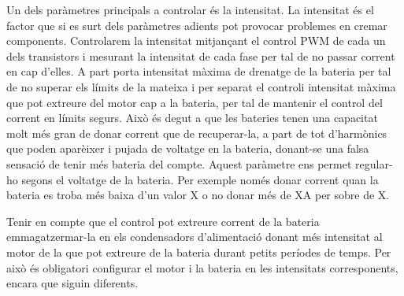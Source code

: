 Un dels paràmetres principals a controlar és la intensitat. La intensitat és el factor que si es surt dels paràmetres adients pot provocar problemes en cremar components. Controlarem la intensitat mitjançant el control PWM de cada un dels transistors i mesurant la intensitat de cada fase per tal de no passar corrent en cap d'elles. A part porta intensitat màxima de drenatge de la bateria per tal de no superar els límits de la mateixa i per separat el controli intensitat màxima que pot extreure del motor cap a la bateria, per tal de mantenir el control del corrent en límits segurs. Això és degut a que les bateries tenen una capacitat molt més gran de donar corrent que de recuperar-la, a part de tot d'harmònics que poden aparèixer i pujada de voltatge en la bateria, donant-se una falsa sensació de tenir més bateria del compte. Aquest paràmetre ens permet regular-ho segons el voltatge de la bateria. Per exemple només donar corrent quan la bateria es troba més baixa d'un valor X o no donar més de XA per sobre de X.
 
Tenir en compte que el control pot extreure corrent de la bateria emmagatzermar-la en els condensadors d'alimentació donant més intensitat al motor de la que pot extreure de la bateria durant petits períodes de temps. Per això és obligatori configurar el motor i la bateria en les intensitats corresponents, encara que siguin diferents.    
    
